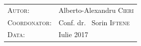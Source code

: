 \begin{titlingpage}
\begin{SingleSpace}
    \scalebox{1.5} {
        \begin{tabular}{l@{\hskip 1in}l}
        \textsc{Autor}: & Alberto-Alexandru \textsc{Cieri} \\
        \textsc{Coordonator}: & Conf. dr. ~Sorin \textsc{Iftene}\\
        \textsc{Data}: & Iulie 2017
        \end{tabular}
    }
    
	\vfill
\end{SingleSpace}
\end{titlingpage}